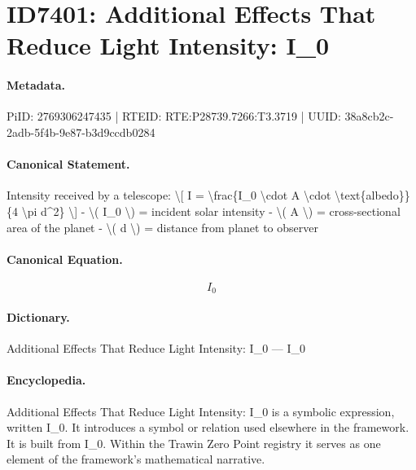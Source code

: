 \section*{ID7401: Additional Effects That Reduce Light Intensity: I\_0}
\paragraph{Metadata.}
PiID: 2769306247435 | RTEID: RTE:P28739.7266:T3.3719 | UUID: 38a8cb2c-2adb-5f4b-9e87-b3d9ccdb0284

\paragraph{Canonical Statement.}
Intensity received by a telescope: \textbackslash{}[ I = \textbackslash{}frac\{I\_0 \textbackslash{}cdot A \textbackslash{}cdot \textbackslash{}text\{albedo\}\}\{4 \textbackslash{}pi d\textasciicircum{}2\} \textbackslash{}] - \textbackslash{}( I\_0 \textbackslash{}) = incident solar intensity - \textbackslash{}( A \textbackslash{}) = cross-sectional area of the planet - \textbackslash{}( d \textbackslash{}) = distance from planet to observer

\paragraph{Canonical Equation.}
\[
I_0
\]

\paragraph{Dictionary.}
Additional Effects That Reduce Light Intensity: I\_0 — I\_0

\paragraph{Encyclopedia.}
Additional Effects That Reduce Light Intensity: I\_0 is a symbolic expression, written I\_0. It introduces a symbol or relation used elsewhere in the framework. It is built from I\_0. Within the Trawin Zero Point registry it serves as one element of the framework's mathematical narrative.
